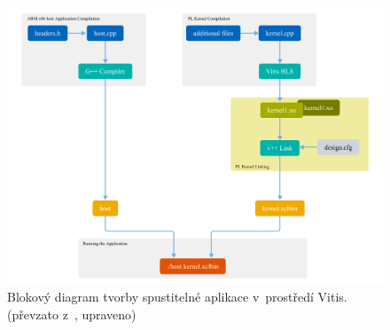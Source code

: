 \documentclass[a4paper, twoside, 11pt]{article}
\begin{document}
		\begin{figure}[htbp!]
			\centering
			\includegraphics[width=1\textwidth]{src/png/vitis-development-flow.png}
			\caption{Blokový diagram tvorby spustitelné aplikace v~prostředí Vitis. (převzato z~\cite{vitis-unified-software-platform-documentation-2022}, upraveno)}
			\label{fig:vitis-development-flow}
		\end{figure}
		
\end{document}
